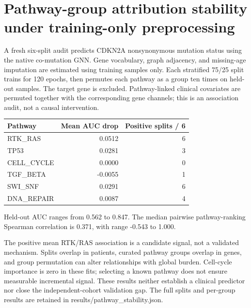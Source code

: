 \section{Pathway-group attribution stability under training-only preprocessing}

A fresh six-split audit predicts CDKN2A nonsynonymous mutation status using the native co-mutation GNN. Gene vocabulary, graph adjacency, and missing-age imputation are estimated using training samples only. Each stratified 75/25 split trains for 120 epochs, then permutes each pathway as a group ten times on held-out samples. The target gene is excluded. Pathway-linked clinical covariates are permuted together with the corresponding gene channels; this is an association audit, not a causal intervention.

\begin{center}\begin{tabular}{lrr}\hline Pathway & Mean AUC drop & Positive splits / 6\\\hline

RTK\_RAS & 0.0512 & 6 \\

TP53 & 0.0281 & 3 \\

CELL\_CYCLE & 0.0000 & 0 \\

TGF\_BETA & -0.0055 & 1 \\

SWI\_SNF & 0.0291 & 6 \\

DNA\_REPAIR & 0.0087 & 4 \\

\hline\end{tabular}\end{center}

Held-out AUC ranges from 0.562 to 0.847. The median pairwise pathway-ranking Spearman correlation is 0.371, with range -0.543 to 1.000.

The positive mean RTK/RAS association is a candidate signal, not a validated mechanism. Splits overlap in patients, curated pathway groups overlap in genes, and group permutation can alter relationships with global burden. Cell-cycle importance is zero in these fits; selecting a known pathway does not ensure measurable incremental signal. These results neither establish a clinical predictor nor close the independent-cohort validation gap. The full splits and per-group results are retained in results/pathway\_stability.json.
